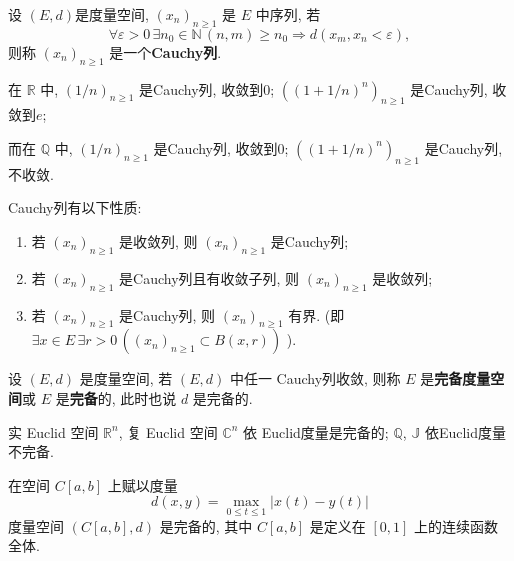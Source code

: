 \documentclass[lang=cn,10pt]{gorgeousnbook}
\numberwithin{equation}{section}%
\numberwithin{figure}{section}%
\begin{document}
\begin{definition}[Cauchy列]\label{def:Cauchy列}
设 $ (E, d) $是度量空间, $ (x_{n})_{n\geqslant1} $ 是 $ E $  中序列, 若
\[
  \forall \varepsilon>0\,\exists n_{0}\in\mathbb{N}\,(n,m) \geqslant n_{0}\Rightarrow d(x_{m},x_{n}<\varepsilon),
\]
则称 $ (x_{n})_{n\geqslant1} $ 是一个\textbf{Cauchy列}.
\end{definition}
 
\begin{exercise}
在 $\mathbb{R}$ 中,  $ (1/n)_{n\geqslant1} $ 是Cauchy列, 收敛到0; $ ((1+{1}/{n})^{n})_{n\geqslant1} $ 是Cauchy列, 收敛到$e$;

而在 $\mathbb{Q}$ 中, $ (1/n)_{n\geqslant1} $ 是Cauchy列, 收敛到0; $ ((1+{1}/{n})^{n})_{n\geqslant1} $ 是Cauchy列, 不收敛.
\end{exercise}

\begin{proposition}\label{prop:Cauchy列的性质}
   Cauchy列有以下性质:
   \begin{enumerate}[(1)]
      \item 若 $ (x_{n})_{n\geqslant1} $ 是收敛列, 则 $ (x_{n})_{n\geqslant1} $ 是Cauchy列;
      \item 若 $ (x_{n})_{n\geqslant1} $ 是Cauchy列且有收敛子列, 则 $ (x_{n})_{n\geqslant1} $ 是收敛列;
      \item 若 $ (x_{n})_{n\geqslant1} $ 是Cauchy列, 则 $ (x_{n})_{n\geqslant1} $ 有界. (即 $ \exists x\in E\,\exists r>0\,((x_{n})_{n\geqslant1} \subset B(x, r)) $ ).
\end{enumerate}
\end{proposition}
 
\begin{definition}[完备]\label{def:完备}
   设 $ (E, d) $ 是度量空间, 若 $ (E, d) $ 中任一 Cauchy列收敛, 则称 $ E $ 是\textbf{完备度量空间}或 $ E $ 是\textbf{完备}的, 此时也说 $ d $ 是完备的.
\end{definition}
 
\begin{exercise}
   实 Euclid 空间 $ \mathbb{R}^{n} $, 复 Euclid 空间 $ \mathbb{C}^{n} $ 依 Euclid度量是完备的; $\mathbb{Q}$, $\mathbb{J}$ 依Euclid度量不完备.
\end{exercise}

\begin{exercise}
在空间 $ C[a, b] $ 上赋以度量
\[
  d(x, y)=\max_{0\leqslant t\leqslant1} \left| {x(t)-y(t)} \right|
\]
度量空间 $ (C[a, b], d) $ 是完备的, 其中 $ C[a, b] $ 是定义在 $ [0, 1] $ 上的连续函数全体.
\end{exercise}
\end{document}
